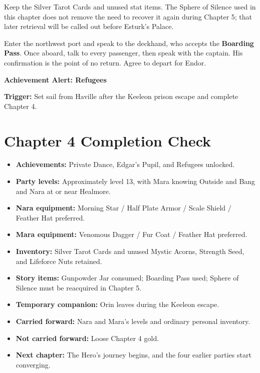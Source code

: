 \documentclass[
  american,
  10pt,
  letterpaper,
  oneside,
  open=any]{scrreprt}
\providecommand{\tightlist}{%
  \setlength{\itemsep}{0pt}\setlength{\parskip}{0pt}}
\begin{document}
Keep the Silver Tarot Cards and unused stat items. The Sphere of Silence
used in this chapter does not remove the need to recover it again during
Chapter 5; that later retrieval will be called out before Esturk's
Palace.

Enter the northwest port and speak to the deckhand, who accepts the
\textbf{Boarding Pass}. Once aboard, talk to every passenger, then speak
with the captain. His confirmation is the point of no return. Agree to
depart for Endor.

\begin{achievementalert}

\textbf{Achievement Alert: Refugees}

\textbf{Trigger:} Set sail from Haville after the Keeleon prison escape
and complete Chapter 4.

\end{achievementalert}

\section{Chapter 4 Completion Check}\label{chapter-4-completion-check}

\begin{itemize}
\tightlist
\item
  \textbf{Achievements:} Private Dance, Edgar's Pupil, and Refugees
  unlocked.
\item
  \textbf{Party levels:} Approximately level 13, with Mara knowing
  Outside and Bang and Nara at or near Healmore.
\item
  \textbf{Nara equipment:} Morning Star / Half Plate Armor / Scale
  Shield / Feather Hat preferred.
\item
  \textbf{Mara equipment:} Venomous Dagger / Fur Coat / Feather Hat
  preferred.
\item
  \textbf{Inventory:} Silver Tarot Cards and unused Mystic Acorns,
  Strength Seed, and Lifeforce Nuts retained.
\item
  \textbf{Story items:} Gunpowder Jar consumed; Boarding Pass used;
  Sphere of Silence must be reacquired in Chapter 5.
\item
  \textbf{Temporary companion:} Orin leaves during the Keeleon escape.
\item
  \textbf{Carried forward:} Nara and Mara's levels and ordinary personal
  inventory.
\item
  \textbf{Not carried forward:} Loose Chapter 4 gold.
\item
  \textbf{Next chapter:} The Hero's journey begins, and the four earlier
  parties start converging.
\end{itemize}
\end{document}
